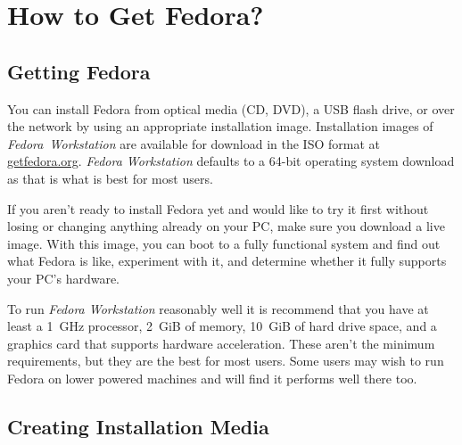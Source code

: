 \chapter*{How to Get Fedora?}
\section*{Getting Fedora}

You can install Fedora from optical media (CD, DVD), a USB flash drive, or over the network by using an appropriate installation image. Installation images of \emph{Fedora~Workstation} are available for download in the ISO format at \url{getfedora.org}. \emph{Fedora Workstation} defaults to a 64-bit operating system download as that is what is best for most users.

If you aren't ready to install Fedora yet and would like to try it first without losing or changing anything already on your PC, make sure you download a live image. With this image, you can boot to a fully functional system and find out what Fedora is like, experiment with it, and determine whether it fully supports your PC's hardware.

To run \emph{Fedora Workstation} reasonably well it is recommend that you have at least a 1~GHz processor, 2~GiB of memory, 10~GiB of hard drive space, and a graphics card that supports hardware acceleration. These aren't the minimum requirements, but they are the best for most users. Some users may wish to run Fedora on lower powered machines and will find it performs well there too.

\section*{Creating Installation Media}

